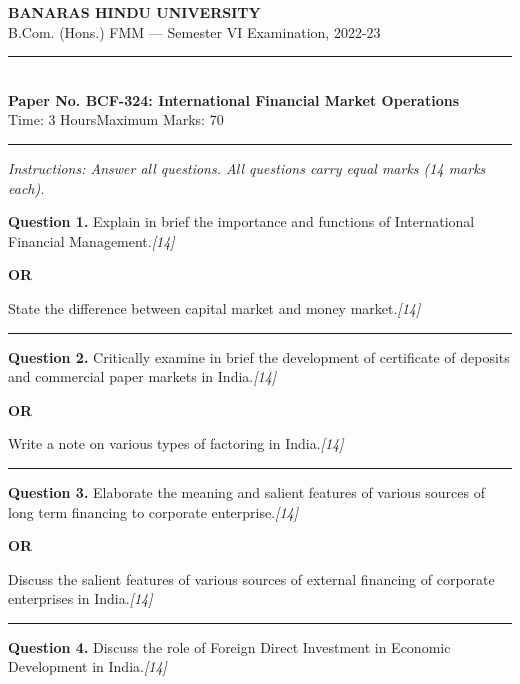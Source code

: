 \documentclass[11pt,a4paper]{article}
\newcommand{\pts}[1]{\hfill   \textit{[#1]}}
\begin{document}
\begin{center}
  {\large\bfseries BANARAS HINDU UNIVERSITY}\\[2pt]
  {\normalsize B.Com. (Hons.) FMM --- Semester VI Examination, 2022-23}\\[6pt]
  \rule{0.8\linewidth}{0.5pt}\\[6pt]
  {\large\bfseries Paper No. BCF-324: International Financial Market Operations}\\[4pt]
  {\normalsize Time: 3 Hours\hfill Maximum Marks: 70}
\end{center}

\rule{\linewidth}{0.4pt}

\smallskip



\noindent   \textit{Instructions: Answer all questions. All questions carry equal marks (14 marks each).}

\bigskip




\noindent   \textbf{Question 1.}
Explain in brief the importance and functions of International Financial Management.\pts{14}

\centerline{   \textbf{OR}}

State the difference between capital market and money market.\pts{14}

\medskip\rule{\linewidth}{0.2pt}




\noindent   \textbf{Question 2.}
Critically examine in brief the development of certificate of deposits and commercial paper markets in India.\pts{14}

\centerline{   \textbf{OR}}

Write a note on various types of factoring in India.\pts{14}

\medskip\rule{\linewidth}{0.2pt}




\noindent   \textbf{Question 3.}
Elaborate the meaning and salient features of various sources of long term financing to corporate enterprise.\pts{14}

\centerline{   \textbf{OR}}

Discuss the salient features of various sources of external financing of corporate enterprises in India.\pts{14}

\medskip\rule{\linewidth}{0.2pt}




\noindent   \textbf{Question 4.}
Discuss the role of Foreign Direct Investment in Economic Development in India.\pts{14}
\end{document}
